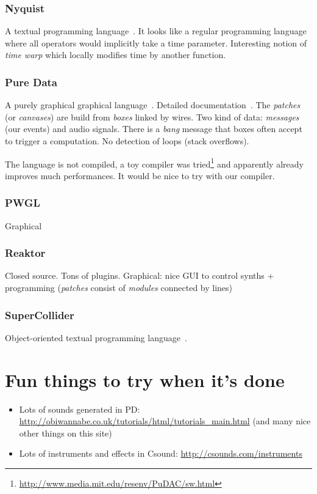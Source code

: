 \documentclass[a4paper,titlepage]{article}
\begin{document}
\subsubsection{Nyquist}
A textual programming language~\cite{nyquist}. It looks like a regular
programming language where all operators would implicitly take a time
parameter. Interesting notion of \emph{time warp} which locally modifies time by
another function.


\subsubsection{Pure Data}
A purely graphical graphical language~\cite{puredata}. Detailed
documentation~\cite{pd-doc}. The \emph{patches} (or \emph{canvases}) are build
from \emph{boxes} linked by wires. Two kind of data: \emph{messages} (our
events) and audio signals. There is a \emph{bang} message that boxes often
accept to trigger a computation. No detection of loops (stack overflows).

The language is not compiled, a toy compiler was
tried\footnote{\url{http://www.media.mit.edu/resenv/PuDAC/sw.html}} and
apparently already improves much performances. It would be nice to try with our compiler.

\subsubsection{PWGL}
\cite{pwgl}
Graphical

\subsubsection{Reaktor}
\cite{reaktor} Closed source. Tons of plugins. Graphical: nice GUI to control
synths + programming (\emph{patches} consist of \emph{modules} connected by
lines)

\subsubsection{SuperCollider}
Object-oriented textual programming language~\cite{supercollider}.

\section{Fun things to try when it's done}
\begin{itemize}
\item Lots of sounds generated in PD:
  \url{http://obiwannabe.co.uk/tutorials/html/tutorials_main.html}
  (and many nice other things on this site)
\item Lots of instruments and effects in Csound:
  \url{http://csounds.com/instruments}
\end{itemize}



\end{document}
